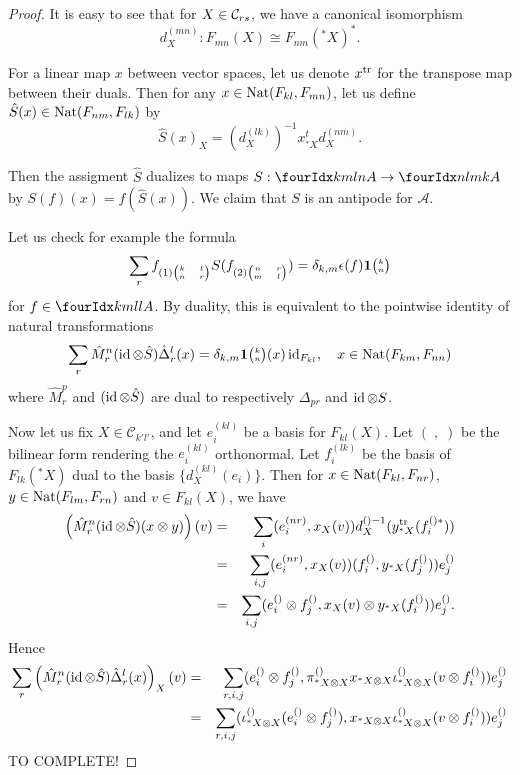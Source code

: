 \begin{proof} It is easy to see that for $X\in \mathcal{C}_{rs}$, we have a canonical isomorphism \[d^{(mn)}_X:F_{mn}(X) \cong F_{nm}({}^*X)^*.\] %

For a linear map $x$ between vector spaces, let us denote $x^{\operatorname{\mathrm{tr}}}$ for the transpose map between their duals. Then for any $x\in \operatorname{\mathrm{Nat}}(F_{kl},F_{mn})$, let us define $\hat{S}(x) \in \operatorname{\mathrm{Nat}}(F_{nm},F_{lk})$ by \[\hat{S}(x)_X = \left(d^{(lk)}_X\right)^{-1} x_{{}^*X}^t d_X^{(nm)}.\] %

Then the assigment $\hat{S}$ dualizes to maps $S:\Gr{A}{k}{l}{m}{n} \rightarrow \Gr{A}{n}{m}{l}{k}$ by $S(f)(x) = f(\hat{S}(x))$. We claim that $S$ is an antipode for $\mathscr{A}$. 

Let us check for example the formula \[\sum_r f_{(1){\tiny \begin{pmatrix}k&l\\n & r\end{pmatrix}}} S(f_{(2){\tiny \begin{pmatrix} n & r \\ m & l\end{pmatrix}}}) = \delta_{k,m}\epsilon(f)\mathbf{1}{\tiny {\begin{pmatrix} k\\n\end{pmatrix}}}\] for $f\in \Gr{A}{k}{l}{m}{l}$. By duality, this is equivalent to the pointwise identity of natural transformations \[\sum_r\hat{M}^n_r(\operatorname{id}\otimes \hat{S})\hat{\Delta}^l_r(x) = \delta_{k,m}\mathbf{1}{\tiny {\begin{pmatrix} k\\n\end{pmatrix}}}(x) \operatorname{id}_{F_{kl}},\quad x\in \operatorname{\mathrm{Nat}}(F_{km},F_{nn})\] where $\hat{M}^p_r$ and $(\operatorname{id}\otimes \hat{S})$ are dual to respectively $\Delta_{pr}$ and $\operatorname{id}\otimes S$. 

Now let us fix $X\in \mathcal{C}_{k'l'}$, and let $e_i^{(kl)}$ be a basis for $F_{kl}(X)$. Let $(\;,\;)$ be the bilinear form rendering the $e_i^{(kl)}$ orthonormal. Let $f_i^{(lk)}$ be the basis of $F_{lk}({}^*X)$ dual to the basis $\{d_X^{(kl)}(e_i)\}$. Then for $x\in \operatorname{\mathrm{Nat}}(F_{kl},F_{nr})$, $y\in \operatorname{\mathrm{Nat}}(F_{lm},F_{rn})$ and $v \in F_{kl}(X)$, we have \begin{eqnarray*} \left(\hat{M}^n_r(\operatorname{id}\otimes \hat{S})(x\otimes y)\right)(v) &=& \sum_i (e_i^{(nr)},x_X(v))  d_X^{()-1}(y_{{}^*X}^{\operatorname{\mathrm{tr}}}(f_i^{()*}))\\ &=& \sum_{i,j} (e_i^{(nr)},x_X(v))  (f_i^{()},y_{{}^*X}(f_j^{()}))e_j^{()} \\ &=& \sum_{i,j}(e_i^{()}\otimes f_j^{()},x_X(v)\otimes y_{{}^*X}(f_i^{()}))e_j^{()}.\end{eqnarray*} Hence \begin{eqnarray*} \sum_r \left(\hat{M}^n_r(\operatorname{id}\otimes \hat{S})\hat{\Delta}^l_r(x)\right)_X(v) &=& \sum_{r,i,j}(e_i^{()}\otimes f_j^{()}, \pi_{{}^*X\otimes X}^{()}x_{{}^*X\otimes X}\iota_{{}^*X\otimes X}^{()}(v\otimes f_i^{()}))e_j^{()}\\ &=&  \sum_{r,i,j}(\iota_{{}^*X\otimes X}^{()}(e_i^{()}\otimes f_j^{()}), x_{{}^*X\otimes X}\iota_{{}^*X\otimes X}^{()}(v\otimes f_i^{()}))e_j^{()}
\end{eqnarray*}
TO COMPLETE!
\end{proof} 

